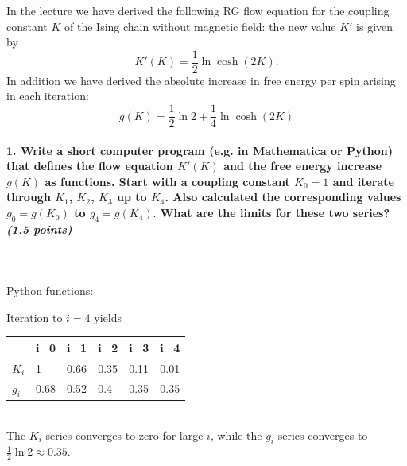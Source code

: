 In the lecture we have derived the following 
RG flow equation for the coupling constant $K$ 
of the Ising chain without magnetic field: 
the new value $K'$ is given by
\begin{equation}
    K'(K)=\frac{1}{2}\ln\cosh(2K).
\end{equation}
In addition we have derived the absolute 
increase in free energy per spin arising in 
each iteration:
\begin{equation}
    g(K)=\frac{1}{2}\ln2
    +\frac{1}{4}\ln\cosh(2K)
\end{equation}

\paragraph{1. Write a short computer program 
    (e.g. in Mathematica or Python) that 
    defines the flow equation $K'(K)$ and the 
    free energy increase $g(K)$ as functions. 
    Start with a coupling constant $K_0=1$ and 
    iterate through $K_1$, $K_2$, $K_3$ up to 
    $K_4$. Also calculated the corresponding 
    values $g_0=g(K_0)$ to $g_4=g(K_4).$ What 
    are the limits for these two series? 
    \textit{(1.5 points)}
} \ \\
    \\
    Python functions:
    
    Iteration to $i=4$ yields
    \begin{table}[h!]
        \begin{center}
        \begin{tabular}{llllll}
                  & i=0  & i=1  & i=2  & i=3  & i=4  \\ 
            \hline
            $K_i$ & 1    & 0.66 & 0.35 & 0.11 & 0.01 \\ 
            $g_i$ & 0.68 & 0.52 & 0.4  & 0.35 & 0.35 \\ 
        \end{tabular}
        \end{center}
    \end{table} \ \\ 
    The $K_i$-series converges to zero for 
    large $i$, while the $g_i$-series 
    converges to $\frac{1}{2}\ln2\approx0.35$.

